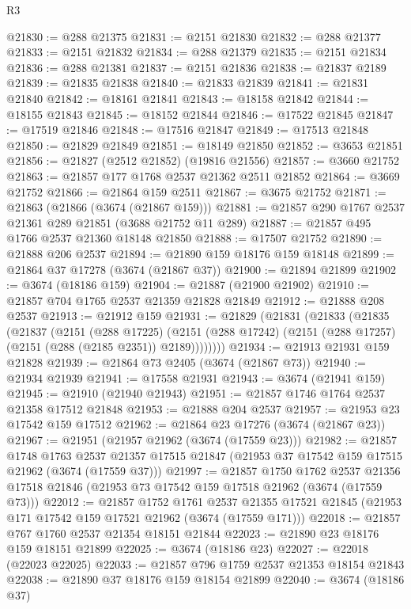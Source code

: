 \begin{lexlean}{R3}
\begin{coremodule}
@21830 := @288 @21375
@21831 := @2151 @21830
@21832 := @288 @21377
@21833 := @2151 @21832
@21834 := @288 @21379
@21835 := @2151 @21834
@21836 := @288 @21381
@21837 := @2151 @21836
@21838 := @21837 @2189
@21839 := @21835 @21838
@21840 := @21833 @21839
@21841 := @21831 @21840
@21842 := @18161 @21841
@21843 := @18158 @21842
@21844 := @18155 @21843
@21845 := @18152 @21844
@21846 := @17522 @21845
@21847 := @17519 @21846
@21848 := @17516 @21847
@21849 := @17513 @21848
@21850 := @21829 @21849
@21851 := @18149 @21850
@21852 := @3653 @21851
@21856 := @21827 (@2512 @21852) (@19816 @21556)
@21857 := @3660 @21752
@21863 := @21857 @177 @1768 @2537 @21362 @2511 @21852
@21864 := @3669 @21752
@21866 := @21864 @159 @2511
@21867 := @3675 @21752
@21871 := @21863 (@21866 (@3674 (@21867 @159)))
@21881 := @21857 @290 @1767 @2537 @21361 @289 @21851 (@3688 @21752 @11 @289)
@21887 := @21857 @495 @1766 @2537 @21360 @18148 @21850
@21888 := @17507 @21752
@21890 := @21888 @206 @2537
@21894 := @21890 @159 @18176 @159 @18148
@21899 := @21864 @37 @17278 (@3674 (@21867 @37))
@21900 := @21894 @21899
@21902 := @3674 (@18186 @159)
@21904 := @21887 (@21900 @21902)
@21910 := @21857 @704 @1765 @2537 @21359 @21828 @21849
@21912 := @21888 @208 @2537
@21913 := @21912 @159
@21931 := @21829
    (@21831
      (@21833
        (@21835
          (@21837
            (@2151
              (@288 @17225)
              (@2151 (@288 @17242) (@2151 (@288 @17257) (@2151 (@288 (@2185 @2351)) @2189))))))))
@21934 := @21913 @21931 @159 @21828
@21939 := @21864 @73 @2405 (@3674 (@21867 @73))
@21940 := @21934 @21939
@21941 := @17558 @21931
@21943 := @3674 (@21941 @159)
@21945 := @21910 (@21940 @21943)
@21951 := @21857 @1746 @1764 @2537 @21358 @17512 @21848
@21953 := @21888 @204 @2537
@21957 := @21953 @23 @17542 @159 @17512
@21962 := @21864 @23 @17276 (@3674 (@21867 @23))
@21967 := @21951 (@21957 @21962 (@3674 (@17559 @23)))
@21982 := @21857
    @1748
    @1763
    @2537
    @21357
    @17515
    @21847
    (@21953 @37 @17542 @159 @17515 @21962 (@3674 (@17559 @37)))
@21997 := @21857
    @1750
    @1762
    @2537
    @21356
    @17518
    @21846
    (@21953 @73 @17542 @159 @17518 @21962 (@3674 (@17559 @73)))
@22012 := @21857
    @1752
    @1761
    @2537
    @21355
    @17521
    @21845
    (@21953 @171 @17542 @159 @17521 @21962 (@3674 (@17559 @171)))
@22018 := @21857 @767 @1760 @2537 @21354 @18151 @21844
@22023 := @21890 @23 @18176 @159 @18151 @21899
@22025 := @3674 (@18186 @23)
@22027 := @22018 (@22023 @22025)
@22033 := @21857 @796 @1759 @2537 @21353 @18154 @21843
@22038 := @21890 @37 @18176 @159 @18154 @21899
@22040 := @3674 (@18186 @37)

\end{coremodule}
\end{lexlean}
